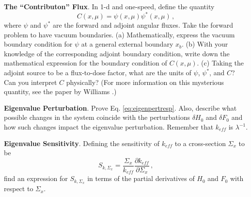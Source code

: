 \begin{exercises}
  \item \textbf{The ``Contributon'' Flux}. In 1-d and one-speed, define the quantity 
  \begin{equation*}
   C(x,\mu) = \psi(x,\mu)\psi^*(x,\mu) \, ,
  \end{equation*}
  where $\psi$ and $\psi^*$ are the forward and adjoint angular fluxes.  Take the forward problem to have vacuum boundaries.  (a) Mathematically, express the vacuum boundary condition for $\psi$ at a general external boundary $x_b$.  (b) With your knowledge of the corresponding adjoint boundary condition, write down the mathematical expression for the boundary condition of $C(x,\mu)$.  (c) Taking the adjoint source to be a flux-to-dose factor, what are the units of $\psi$, $\psi^*$, and $C$?  Can you interpret $C$ physically?  (For more information on this mysterious quantity, see the paper by Williams \cite{williams1991gcr}.)

  \item \textbf{Eigenvalue Perturbation}.  Prove Eq. \ref{eq:eigenpertresp}.  Also, describe what possible changes in the system coincide with the perturbations $\delta H_0$ and $\delta F_0$ and how such changes impact the eigenvalue perturbation.  Remember that $k_{e\!f\!f}$ is $\lambda^{-1}$.

  \item \textbf{Eigenvalue Sensitivity}.  Defining the sensitivity of $k_{e\!f\!f}$ to a cross-section $\Sigma_x$ to be
  \begin{equation*}
   S_{k,\Sigma_x} = \frac{\Sigma_x}{k_{e\!f\!f} }\frac{\partial k_{e\!f\!f}}{ \partial \Sigma_x} \, ,
  \end{equation*}
  find an expression for $S_{k,\Sigma_x}$ in terms of the partial derivatives of $H_0$ and $F_0$ with respect to $\Sigma_x$.


\end{exercises}
